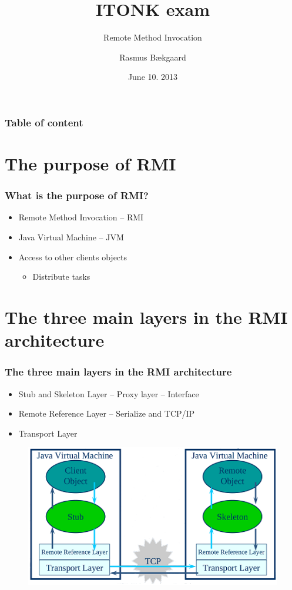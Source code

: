 \documentclass{beamer}
\title{ITONK exam}
\subtitle{Remote Method Invocation}
\author %
{Rasmus Bækgaard\inst{1}}
\institute%
{
  \inst{1}%
  Information and Communication Technology\\
  Aarhus University, School of Engineering
}
\date{June 10. 2013}
\begin{document}
	\frame{\titlepage}
	
	\begin{frame}
		\frametitle{Table of content}
		\tableofcontents%
	\end{frame}

\section{The purpose of RMI}
	\begin{frame}
		\frametitle{What is the purpose of RMI?}
		
		\begin{itemize}
		\item Remote Method Invocation -- RMI
		\item Java Virtual Machine -- JVM
		\item Access to other clients objects
		
			\begin{itemize}
			\item Distribute tasks
			\end{itemize}
		\end{itemize}
			
	\end{frame}
	
	
	
\section{The three main layers in the RMI architecture}
	\begin{frame}
		\frametitle{The three main layers in the RMI architecture}
		
		\begin{itemize}
		\item Stub and Skeleton Layer -- Proxy layer -- Interface
		\item Remote Reference Layer -- Serialize and TCP/IP
		\item Transport Layer
		\end{itemize}
		
		\begin{figure}[hbtp]
		\centering
		\includegraphics[scale=0.7]{JVM}
		\end{figure}		

				
	\end{frame}
		
\end{document}

